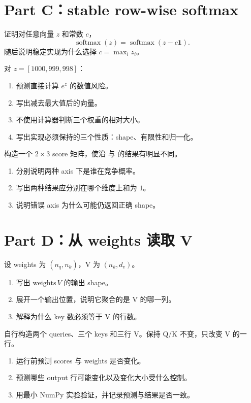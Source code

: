 \documentclass[11pt,a4paper]{article}
\begin{document}
\section{Part C：stable row-wise softmax}

证明对任意向量 $z$ 和常数 $c$，
\[
\operatorname{softmax}(z)=\operatorname{softmax}(z-c\mathbf{1}).
\]
随后说明稳定实现为什么选择 $c=\max_i z_i$。
\AnswerSpace{34mm}

对 $z=[1000,999,998]$：
\begin{enumerate}[label=(\arabic*)]
\item 预测直接计算 $e^z$ 的数值风险。
\item 写出减去最大值后的向量。
\item 不使用计算器判断三个权重的相对大小。
\item 写出实现必须保持的三个性质：shape、有限性和归一化。
\end{enumerate}
\AnswerSpace{30mm}

构造一个 $2\times3$ score 矩阵，使沿  与  的结果有明显不同。
\begin{enumerate}[label=(\arabic*)]
\item 分别说明两种 axis 下是谁在竞争概率。
\item 写出两种结果应分别在哪个维度上和为 $1$。
\item 说明错误 axis 为什么可能仍返回正确 shape。
\end{enumerate}
\AnswerSpace{36mm}

\section{Part D：从 weights 读取 V}

设 weights 为 $(n_{q},n_{k})$，V 为 $(n_{k},d_v)$。
\begin{enumerate}[label=(\arabic*)]
\item 写出 $\text{weights}\,V$ 的输出 shape。
\item 展开一个输出位置，说明它聚合的是 V 的哪一列。
\item 解释为什么 key 数必须等于 V 的行数。
\end{enumerate}
\AnswerSpace{28mm}

自行构造两个 queries、三个 keys 和三行 V。保持 Q/K 不变，只改变 V 的一行。
\begin{enumerate}[label=(\arabic*)]
\item 运行前预测 scores 与 weights 是否变化。
\item 预测哪些 output 行可能变化以及变化大小受什么控制。
\item 用最小 NumPy 实验验证，并记录预测与结果是否一致。
\end{enumerate}
\AnswerSpace{34mm}
\end{document}
